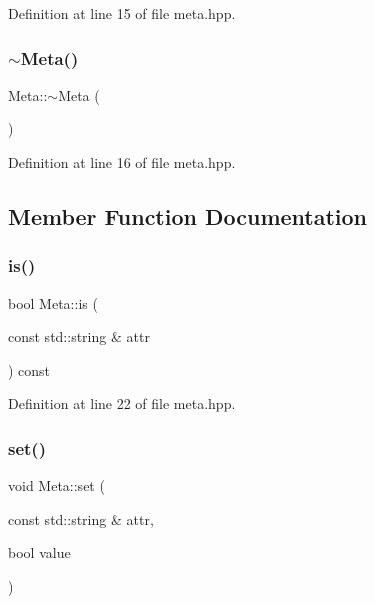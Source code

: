Definition at line 15 of file meta.\+hpp.

\mbox{\label{class_meta_a6a2199955a1318b54f7d4d2a0e470b36}} 
\subsubsection{\texorpdfstring{$\sim$\+Meta()}{~Meta()}}
{\footnotesize\ttfamily Meta\+::$\sim$\+Meta (\begin{DoxyParamCaption}{ }\end{DoxyParamCaption})\hspace{0.3cm}{\ttfamily [inline]}}



Definition at line 16 of file meta.\+hpp.



\subsection{Member Function Documentation}
\mbox{\label{class_meta_a935668f7ea11c899be35505093a15415}} 
\subsubsection{\texorpdfstring{is()}{is()}}
{\footnotesize\ttfamily bool Meta\+::is (\begin{DoxyParamCaption}\item[{const std\+::string \&}]{attr }\end{DoxyParamCaption}) const\hspace{0.3cm}{\ttfamily [inline]}}



Definition at line 22 of file meta.\+hpp.

\mbox{\label{class_meta_a988be331a6084a39edafbeb7c5553ca5}} 
\subsubsection{\texorpdfstring{set()}{set()}}
{\footnotesize\ttfamily void Meta\+::set (\begin{DoxyParamCaption}\item[{const std\+::string \&}]{attr,  }\item[{bool}]{value }\end{DoxyParamCaption})\hspace{0.3cm}{\ttfamily [inline]}}



